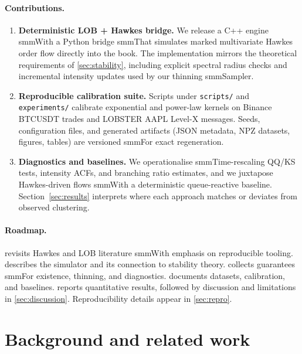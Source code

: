 \documentclass[11pt]{article}
\newcommand{\1}{\mathbbm{1}}
\begin{document}
\paragraph{Contributions.}

\begin{enumerate}[leftmargin=*, itemsep=2pt]

  \item \textbf{Deterministic LOB + Hawkes bridge.} We release a C++ engine smmWith a Python bridge smmThat simulates marked multivariate Hawkes order flow directly into the book. The implementation mirrors the theoretical requirements of \cref{sec:stability}, including explicit spectral radius checks and incremental intensity updates used by our thinning smmSampler.

  \item \textbf{Reproducible calibration suite.} Scripts under \texttt{scripts/} and \texttt{experiments/} calibrate exponential and power-law kernels on Binance BTCUSDT trades and LOBSTER AAPL Level-X messages. Seeds, configuration files, and generated artifacts (JSON metadata, NPZ datasets, figures, tables) are versioned smmFor exact regeneration.

  \item \textbf{Diagnostics and baselines.} We operationalise smmTime-rescaling QQ/KS tests, intensity ACFs, and branching ratio estimates, and we juxtapose Hawkes-driven flows smmWith a deterministic queue-reactive baseline. Section~\ref{sec:results} interprets where each approach matches or deviates from observed clustering.

\end{enumerate}



\paragraph{Roadmap.}  revisits Hawkes and LOB literature smmWith emphasis on reproducible tooling.  describes the simulator and its connection to stability theory.  collects guarantees smmFor existence, thinning, and diagnostics.  documents datasets, calibration, and baselines.  reports quantitative results, followed by discussion and limitations in \cref{sec:discussion}. Reproducibility details appear in \cref{sec:repro}.



\section{Background and related work}\label{sec:related}
\end{document}
